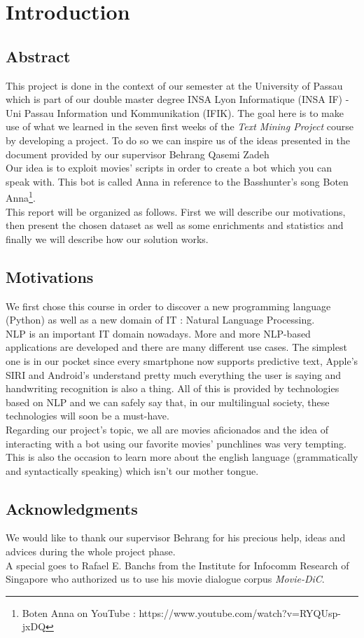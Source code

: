 \section{Introduction}
\subsection{Abstract}
This project is done in the context of our semester at the University of Passau which is part of our double master degree INSA Lyon Informatique (INSA IF) - Uni Passau Information und Kommunikation (IFIK).
The goal here is to make use of what we learned in the seven first weeks of the \textit{Text Mining Project} course by developing a project. To do so we can inspire us of the ideas presented in the document provided by our supervisor Behrang Qasemi Zadeh \cite{idea} \\
Our idea is to exploit movies' scripts in order to create a bot which you can speak with. This bot is called Anna in reference to the Basshunter's song Boten Anna\footnote{Boten Anna on YouTube : https://www.youtube.com/watch?v=RYQUsp-jxDQ}. \\
This report will be organized as follows. First we will describe our motivations, then present the chosen dataset as well as some enrichments and statistics and finally we will describe how our solution works.
% 
\subsection{Motivations}
We first chose this course in order to discover a new programming language (Python) as well as a new domain of IT : Natural Language Processing.\\
NLP is an important IT domain nowadays. More and more NLP-based applications are developed and there are many different use cases. The simplest one is in our pocket since every smartphone now supports predictive text, Apple's SIRI and Android's  understand pretty much everything the user is saying and handwriting recognition is also a thing. All of this is provided by technologies based on NLP and we can safely say that, in our multilingual society, these technologies will soon be a must-have.\\
Regarding our project's topic, we all are movies aficionados and the idea of interacting with a bot using our favorite movies' punchlines was very tempting. This is also the occasion to learn more about the english language (grammatically and syntactically speaking) which isn't our mother tongue.

\subsection{Acknowledgments}
We would like to thank our supervisor Behrang for his precious help, ideas and advices during the whole project phase.\\
A special  goes to Rafael E. Banchs from the Institute for Infocomm Research of Singapore who authorized us to use his movie dialogue corpus \textit{Movie-DiC}.